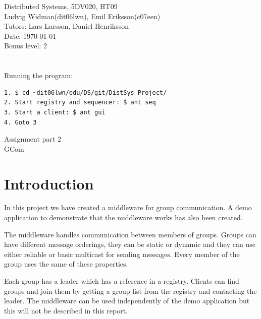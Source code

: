 \documentclass[a4paper,english]{article}
\def\author			{Ludvig Widman(dit06lwn), Emil Eriksson(c07een)}
\def\course			{Distributed Systems, 5DV020, HT09}
\def\delivery		{Assignment part 2}
\def\trivialname	{GCom}
\def\tutor			{Lars Larsson, Daniel Henriksson}
\begin{document}
\begin{titlepage}
\noindent
\course \\
\author \\

\noindent
Tutors: \tutor \\
Date: \today \\
Bonus level: 2\\
\\
\\
Running the program: 
\begin{verbatim}
1. $ cd ~dit06lwn/edu/DS/git/DistSys-Project/
2. Start registry and sequencer: $ ant seq
3. Start a client: $ ant gui
4. Goto 3
\end{verbatim}

\begin{center}
	\vspace{20mm}
        \Huge \delivery \\
        \vspace{5mm}
        \Huge \trivialname \\
        \vspace{20mm}
        
\end{center}

\end{titlepage}
\thispagestyle{empty}
\tableofcontents
\thispagestyle{empty}
\newpage
{}


\section{Introduction}
In this project we have created a middleware for group communication. A demo application to demonstrate that the middleware works has also been created. 

The middleware handles communication between members of groups. Groups can have different message orderings, they can be static or dynamic and they can use either reliable or basic multicast for sending messages. Every member of the group uses the same of these properties.

Each group has a leader which has a reference in a registry. Clients can find groups and join them by getting a group list from the registry and contacting the leader.
The middleware can be used independently of the demo application but this will not be described in this report.
\end{document}
